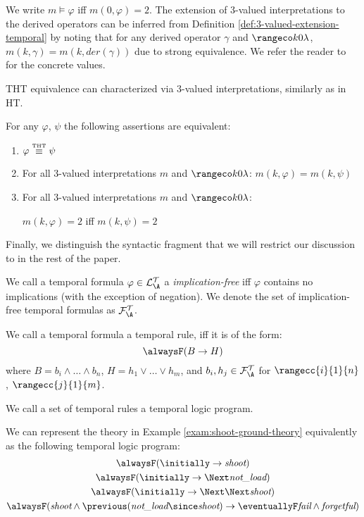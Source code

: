 We write $m \models \varphi$ iff $m(0,\varphi)=2$. The extension of
3-valued interpretations to the derived operators can be inferred from
Definition \ref{def:3-valued-extension-temporal} by noting that for
any derived operator $\gamma$ and $\kinlambda$,
$m(k,\gamma)=m(k,der(\gamma))$ due to strong equivalence. We refer the
reader to \cite{agcadipescscvi20a} for the concrete values.

THT equivalence can characterized via 3-valued interpretations, similarly as in HT.

\begin{proposition}\label{prop:char-strong-equiv-3val}
For any $\varphi$, $\psi$ the following assertions are equivalent:
  \begin{enumerate}[label={(\arabic*)}]
    \setlength\itemsep{0.15em}
    \item $\varphi \stackrel{\normalfont\mbox{\tiny THT}}{\equiv} \psi$
    \item For all 3-valued interpretations $m$ and $\kinlambda$: $m(k,\varphi) = m(k,\psi)$
    \item For all 3-valued interpretations $m$ and $\kinlambda$: 
      
$m(k,\varphi) = 2$ iff $m(k,\psi) = 2$
  \end{enumerate}
\end{proposition}

Finally, we distinguish the syntactic fragment that we will restrict
our discussion to in the rest of the paper.

\begin{definition}
  We call a temporal formula $\varphi \in \langat$ a
  \emph{implication-free} iff $\varphi$ contains no implications (with
  the exception of negation). We denote the set of implication-free
  temporal formulas as $\langfat$.
  
  We call a temporal formula a temporal rule, iff it is of the form:
  $$
  \tempruleshort
  $$
  where $B=b_i \land \dots \land b_n$, $H=h_1 \lor \dots \lor h_m$,
  and $b_i,h_j \in \langfat$ for $\rangecc{i}{1}{n}$,
  $\rangecc{j}{1}{m}$.  

  We call a set of temporal rules a temporal logic program.
\end{definition}

\begin{example}\label{exam:shoot-ground-program}
  We can represent the theory in Example
  \ref{exam:shoot-ground-theory} equivalently as the following
  temporal logic program:
\begin{equation*}
\begin{gathered}
\alwaysF (\initially \rightarrow \textit{shoot})\\
\alwaysF (\initially \rightarrow \Next\textit{not\_load})\\
\alwaysF (\initially \rightarrow \Next\Next\textit{shoot})\\
\alwaysF(\textit{shoot} \wedge \previous(\textit{not\_load} \since \textit{shoot})
\rightarrow \eventuallyF \textit{fail} \wedge \textit{forgetful})
\end{gathered}
\end{equation*}
\end{example}
